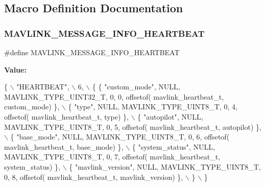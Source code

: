 \subsection{Macro Definition Documentation}
\mbox{\label{common_2mavlink__msg__heartbeat_8h_a0fa39f8cc69d7d07d33f36a5666be63a}} 
\subsubsection{M\+A\+V\+L\+I\+N\+K\+\_\+\+M\+E\+S\+S\+A\+G\+E\+\_\+\+I\+N\+F\+O\+\_\+\+H\+E\+A\+R\+T\+B\+E\+AT}
{\footnotesize\ttfamily \#define M\+A\+V\+L\+I\+N\+K\+\_\+\+M\+E\+S\+S\+A\+G\+E\+\_\+\+I\+N\+F\+O\+\_\+\+H\+E\+A\+R\+T\+B\+E\+AT}

{\bfseries Value\+:}
\begin{DoxyCode}
\{ \(\backslash\)
    \textcolor{stringliteral}{"HEARTBEAT"}, \(\backslash\)
    6, \(\backslash\)
    \{  \{ \textcolor{stringliteral}{"custom\_mode"}, NULL, MAVLINK_TYPE_UINT32_T, 0, 0, offsetof(
      mavlink_heartbeat_t, custom\_mode) \}, \(\backslash\)
         \{ \textcolor{stringliteral}{"type"}, NULL, MAVLINK_TYPE_UINT8_T, 0, 4, offsetof(
      mavlink_heartbeat_t, type) \}, \(\backslash\)
         \{ \textcolor{stringliteral}{"autopilot"}, NULL, MAVLINK_TYPE_UINT8_T, 0, 5, offsetof(
      mavlink_heartbeat_t, autopilot) \}, \(\backslash\)
         \{ \textcolor{stringliteral}{"base\_mode"}, NULL, MAVLINK_TYPE_UINT8_T, 0, 6, offsetof(
      mavlink_heartbeat_t, base\_mode) \}, \(\backslash\)
         \{ \textcolor{stringliteral}{"system\_status"}, NULL, MAVLINK_TYPE_UINT8_T, 0, 7, offsetof(
      mavlink_heartbeat_t, system\_status) \}, \(\backslash\)
         \{ \textcolor{stringliteral}{"mavlink\_version"}, NULL, MAVLINK_TYPE_UINT8_T, 0, 8, offsetof(
      mavlink_heartbeat_t, mavlink\_version) \}, \(\backslash\)
         \} \(\backslash\)
\}
\end{DoxyCode}
\mbox{\label{common_2mavlink__msg__heartbeat_8h_acb2bf2866eb926f089c52a58b082713e}} 
